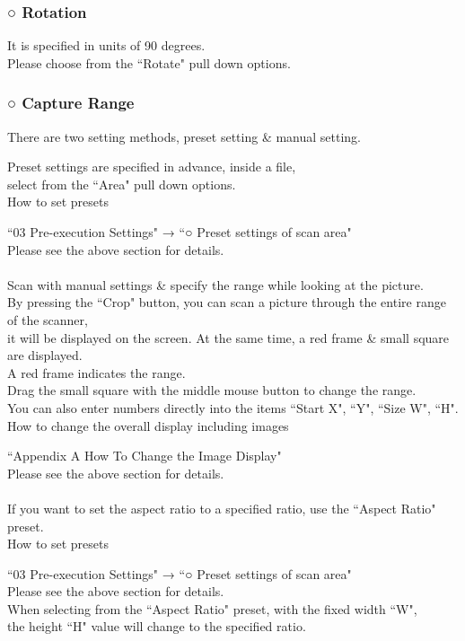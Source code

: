 \documentclass[a4paper,10pt]{article}
\begin{document}
\subsubsection*{○ Rotation}

\noindent It is specified in units of 90 degrees.\\
Please choose from the “Rotate" pull down options.\\

\subsubsection*{○ Capture Range}

\noindent There are two setting methods, preset setting \& manual setting.

\newpage

\noindent Preset settings are specified in advance, inside a file,\\
select from the “Area" pull down options.\\
How to set presets\par
“03 Pre-execution Settings" → “○ Preset settings of scan area"\\
Please see the above section for details.\\
\\
Scan with manual settings \& specify the range while looking at the picture.\\
By pressing the “Crop" button, you can scan a picture through the entire range of the scanner,\\
it will be displayed on the screen. At the same time, a red frame \& small square are displayed.\\
A red frame indicates the range.\\
Drag the small square with the middle mouse button to change the range.\\
You can also enter numbers directly into the items “Start X", “Y", “Size W", “H".\\
How to change the overall display including images\par
“Appendix A How To Change the Image Display"\\
Please see the above section for details.\\
\\
If you want to set the aspect ratio to a specified ratio, use the “Aspect Ratio" preset.\\
How to set presets\par
“03 Pre-execution Settings" → “○ Preset settings of scan area"\\
Please see the above section for details.\\
When selecting from the “Aspect Ratio" preset, with the fixed width “W",\\
the height “H" value will change to the specified ratio.
\end{document}
